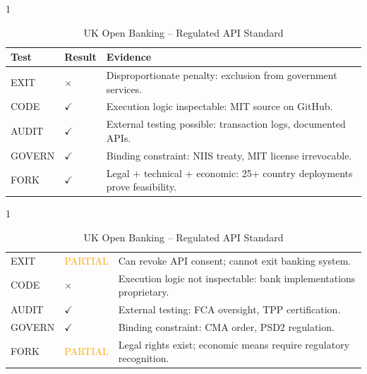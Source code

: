\documentclass{article}
\begin{document}
\begin{table}[htbp]
    \begin{subtable}{1\textwidth}
        \centering
        \caption{X-Road (Estonia/Nordic) -- Data Exchange Layer}
        \small
        \begin{tabular}{@{}llp{8.5cm}@{}}
            \toprule
            \textbf{Test} & \textbf{Result} & \textbf{Evidence} \\
            \midrule
            EXIT & $\times$ & Disproportionate penalty: exclusion from government services. \\
            CODE & $\checkmark$ & Execution logic inspectable: MIT source on GitHub. \\
            AUDIT & $\checkmark$ & External testing possible: transaction logs, documented APIs. \\
            GOVERN & $\checkmark$ & Binding constraint: NIIS treaty, MIT license irrevocable. \\
            FORK & $\checkmark$ & Legal + technical + economic: 25+ country deployments prove feasibility. \\
            \bottomrule
        \end{tabular}
        \vspace{0.3cm}
    \end{subtable}

    \begin{subtable}{1\textwidth}
        \centering
        \caption{UK Open Banking -- Regulated API Standard}
        \small
        \begin{tabular}{@{}llp{8.5cm}@{}}
            \toprule
            EXIT & \textcolor{orange}{PARTIAL} & Can revoke API consent; cannot exit banking system. \\
            CODE & $\times$ & Execution logic not inspectable: bank implementations proprietary. \\
            AUDIT & $\checkmark$ & External testing: FCA oversight, TPP certification. \\
            GOVERN & $\checkmark$ & Binding constraint: CMA order, PSD2 regulation. \\
            FORK & \textcolor{orange}{PARTIAL} & Legal rights exist; economic means require regulatory recognition. \\
            \bottomrule
        \end{tabular}
    \end{subtable}
\end{table}
\end{document}
